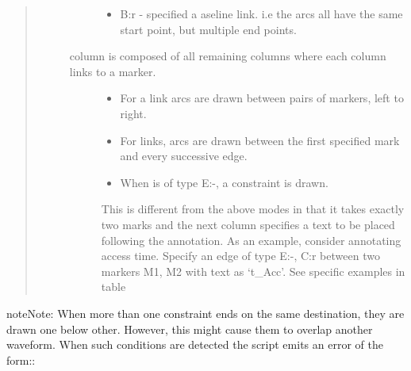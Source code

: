 \documentclass[letterpaper,10pt,english]{sphinxmanual}
\begin{document}
\begin{quote}
\begin{description}
\begin{description}
\begin{itemize}
\item {} 
B:r - specified a aseline link. i.e the arcs all have the same start point, but multiple end points.

\end{itemize}

\item[{\sphinxstyleemphasis{Markers} column is composed of all remaining columns where each column links to a marker.}] \leavevmode\begin{itemize}
\item {} 
For a  link arcs are drawn between pairs of markers, left to right.

\item {} 
For  links, arcs are drawn between the first specified mark and every successive edge.

\item {} 
When   is of type E:\textbar{}-\textbar{}, a constraint is drawn.

\end{itemize}

This is different from the above modes in that it takes exactly two marks and
the next column specifies a text to be placed following the annotation. As an
example, consider annotating access time. Specify an edge of type E:\textbar{}-\textbar{}, C:r
between two markers M1, M2 with text as ‘t\_Acc’. See specific examples in table

\end{description}

\end{description}\end{quote}

\begin{sphinxadmonition}{note}{Note:}
When more than one constraint ends on the same destination, they are drawn
one below other. However, this might cause them to overlap another waveform.
When such conditions are detected the script emits an error of the form::
\end{sphinxadmonition}
\end{document}
